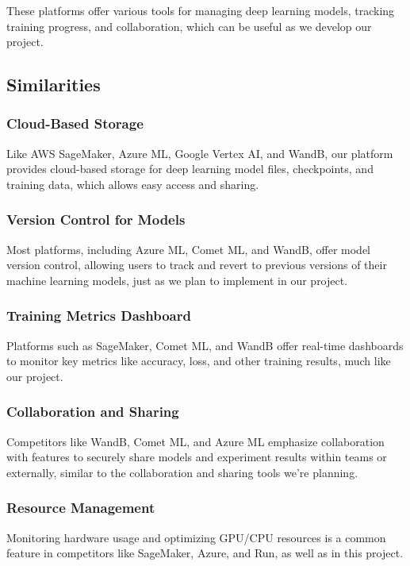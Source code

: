 \documentclass[12pt]{article}
\begin{document}
These platforms offer various tools for managing deep learning models, tracking training progress, and collaboration, which can be useful as we develop our project.

\cite{comet_ml}

\subsection{Similarities}
\subsubsection*{Cloud-Based Storage}
Like AWS SageMaker, Azure ML, Google Vertex AI, and WandB, our platform provides cloud-based storage for deep learning model files, checkpoints, and training data, which allows easy access and sharing.

\subsubsection*{Version Control for Models}
Most platforms, including Azure ML, Comet ML, and WandB, offer model version control, allowing users to track and revert to previous versions of their machine learning models, just as we plan to implement in our project.

\subsubsection*{Training Metrics Dashboard}
Platforms such as SageMaker, Comet ML, and WandB offer real-time dashboards to monitor key metrics like accuracy, loss, and other training results, much like our project.

\subsubsection*{Collaboration and Sharing}
Competitors like WandB, Comet ML, and Azure ML emphasize collaboration with features to securely share models and experiment results within teams or externally, similar to the collaboration and sharing tools we're planning.

\subsubsection*{Resource Management}
Monitoring hardware usage and optimizing GPU/CPU resources is a common feature in competitors like SageMaker, Azure, and Run, as well as in this project.
\end{document}
